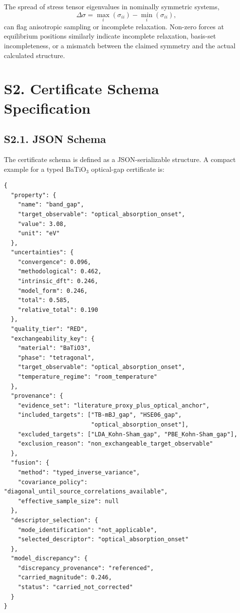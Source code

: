 \documentclass[onecolumn,superscriptaddress,amsmath,amssymb,longbibliography]{revtex4-2}
\begin{document}
The spread of stress tensor eigenvalues in nominally symmetric systems,
\begin{equation}
    \Delta\sigma = \max_i(\sigma_{ii}) - \min_i(\sigma_{ii}),
    \label{eq:si_stress_spread}
\end{equation}
can flag anisotropic sampling or incomplete relaxation. Non-zero forces at
equilibrium positions similarly indicate incomplete relaxation, basis-set
incompleteness, or a mismatch between the claimed symmetry and the actual
calculated structure.


\section{S2. Certificate Schema Specification}
\label{sec:si_schema}

\subsection{S2.1. JSON Schema}

The certificate schema is defined as a JSON-serializable structure. A compact
example for a typed BaTiO$_3$ optical-gap certificate is:

\begin{verbatim}
{
  "property": {
    "name": "band_gap",
    "target_observable": "optical_absorption_onset",
    "value": 3.08,
    "unit": "eV"
  },
  "uncertainties": {
    "convergence": 0.096,
    "methodological": 0.462,
    "intrinsic_dft": 0.246,
    "model_form": 0.246,
    "total": 0.585,
    "relative_total": 0.190
  },
  "quality_tier": "RED",
  "exchangeability_key": {
    "material": "BaTiO3",
    "phase": "tetragonal",
    "target_observable": "optical_absorption_onset",
    "temperature_regime": "room_temperature"
  },
  "provenance": {
    "evidence_set": "literature_proxy_plus_optical_anchor",
    "included_targets": ["TB-mBJ_gap", "HSE06_gap",
                         "optical_absorption_onset"],
    "excluded_targets": ["LDA_Kohn-Sham_gap", "PBE_Kohn-Sham_gap"],
    "exclusion_reason": "non_exchangeable_target_observable"
  },
  "fusion": {
    "method": "typed_inverse_variance",
    "covariance_policy": "diagonal_until_source_correlations_available",
    "effective_sample_size": null
  },
  "descriptor_selection": {
    "mode_identification": "not_applicable",
    "selected_descriptor": "optical_absorption_onset"
  },
  "model_discrepancy": {
    "discrepancy_provenance": "referenced",
    "carried_magnitude": 0.246,
    "status": "carried_not_corrected"
  }
}
\end{verbatim}
\end{document}

